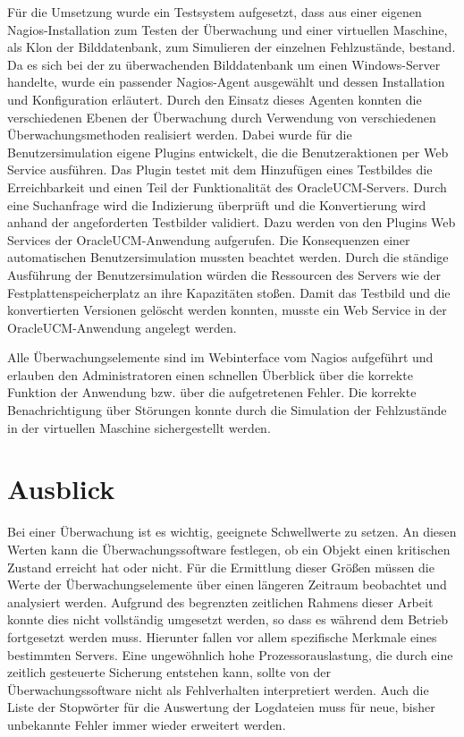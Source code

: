 Für die Umsetzung wurde ein Testsystem aufgesetzt, dass aus einer eigenen Nagios-Installation zum Testen der Überwachung und einer virtuellen Maschine, als Klon der Bilddatenbank, zum Simulieren der einzelnen Fehlzustände, bestand.
Da es sich bei der zu überwachenden Bilddatenbank um einen Windows-Server handelte, wurde ein passender Nagios-Agent ausgewählt und dessen Installation und Konfiguration erläutert.
Durch den Einsatz dieses Agenten konnten die verschiedenen Ebenen der Überwachung durch Verwendung von verschiedenen Überwachungsmethoden realisiert werden.
Dabei wurde für die Benutzersimulation eigene Plugins entwickelt, die die Benutzeraktionen per Web Service ausführen.
Das Plugin testet mit dem Hinzufügen eines Testbildes die Erreichbarkeit und einen Teil der Funktionalität des \gls{OracleUCM}-Servers.
Durch eine Suchanfrage wird die Indizierung überprüft und die Konvertierung wird anhand der angeforderten Testbilder validiert.
Dazu werden von den Plugins Web Services der \gls{OracleUCM}-Anwendung aufgerufen.
Die Konsequenzen einer automatischen Benutzersimulation mussten beachtet werden.
Durch die ständige Ausführung der Benutzersimulation würden die Ressourcen des Servers wie der Festplattenspeicherplatz an ihre Kapazitäten stoßen.
Damit das Testbild und die konvertierten Versionen gelöscht werden konnten, musste ein Web Service in der \gls{OracleUCM}-Anwendung angelegt werden.

Alle Überwachungselemente sind im Webinterface vom Nagios aufgeführt und erlauben den Administratoren einen schnellen Überblick über die korrekte Funktion der Anwendung bzw. über die aufgetretenen Fehler.
Die korrekte Benachrichtigung über Störungen konnte durch die Simulation der Fehlzustände in der virtuellen Maschine sichergestellt werden.
\newpage
\section{Ausblick}
Bei einer Überwachung ist es wichtig, geeignete Schwellwerte zu setzen.
An diesen Werten kann die Überwachungssoftware festlegen, ob ein Objekt einen kritischen Zustand erreicht hat oder nicht.
Für die Ermittlung dieser Größen müssen die Werte der Überwachungselemente über einen längeren Zeitraum beobachtet und analysiert werden.
Aufgrund des begrenzten zeitlichen Rahmens dieser Arbeit konnte dies nicht vollständig umgesetzt werden, so dass es während dem Betrieb fortgesetzt werden muss.
Hierunter fallen vor allem spezifische Merkmale eines bestimmten Servers.
Eine ungewöhnlich hohe Prozessorauslastung, die durch eine zeitlich gesteuerte Sicherung entstehen kann, sollte von der Überwachungssoftware nicht als Fehlverhalten interpretiert werden.
Auch die Liste der Stopwörter für die Auswertung der Logdateien muss für neue, bisher unbekannte Fehler immer wieder erweitert werden.


